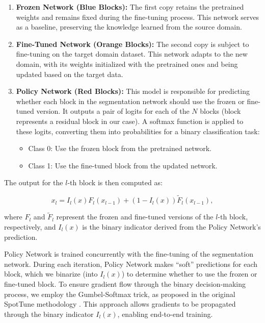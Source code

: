 \begin{enumerate}
	
	\item \textbf{Frozen Network (Blue Blocks):} The first copy retains the pretrained weights and remains fixed during the fine-tuning process. This network serves as a baseline, preserving the knowledge learned from the source domain.
	
	\item \textbf{Fine-Tuned Network (Orange Blocks):} The second copy is subject to fine-tuning on the target domain dataset. This network adapts to the new domain, with its weights initialized with the pretrained ones and being updated based on the target data.
	
	\item \textbf{Policy Network (Red Blocks):} This model is responsible for predicting whether each block in the segmentation network should use the frozen or fine-tuned version. It outputs a pair of logits for each of the $N$ blocks (block represents a residual block in our case). A softmax function is applied to these logits, converting them into probabilities for a binary classification task:
	\begin{itemize}
		\item Class 0: Use the frozen block from the pretrained network.
		\item Class 1: Use the fine-tuned block from the updated network.
	\end{itemize}
	
\end{enumerate}

The output for the $l$-th block is then computed as:

\begin{equation}
	x_l = I_l ( x ) F_l ( x_{l-1} ) + (1 - I_l ( x )) \tilde{F}_l ( x_{l-1} ),
\end{equation}

\noindent
where $F_l$ and $\tilde{F}_l$ represent the frozen and fine-tuned versions of the $l$-th block, respectively, and $I_l(x)$ is the binary indicator derived from the Policy Network’s prediction.

Policy Network is trained concurrently with the fine-tuning of the segmentation network. During each iteration, Policy Network makes ``soft'' predictions for each block, which we binarize (into $I_l(x)$) to determine whether to use the frozen or fine-tuned block. To ensure gradient flow through the binary decision-making process, we employ the Gumbel-Softmax trick, as proposed in the original SpotTune methodology \cite{guo2019spottune}. This approach allows gradients to be propagated through the binary indicator $I_l(x)$, enabling end-to-end training.

